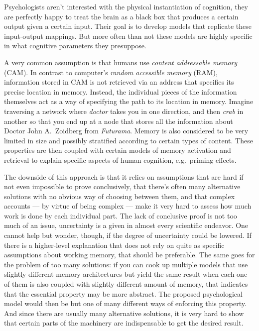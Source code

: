 Psychologists aren't interested with the physical instantiation of cognition, they are perfectly happy to treat the brain as a black box that produces a certain output given a certain input.
Their goal is to develop models that replicate these input-output mappings.
But more often than not these models are highly specific in what cognitive parameters they presuppose.

A very common assumption is that humans use \emph{content addressable memory} (CAM).
In contrast to computer's \emph{random accessible memory} (RAM), information stored in CAM is not retrieved via an address that specifies its precise location in memory.
Instead, the individual pieces of the information themselves act as a way of specifying the path to its location in memory.
Imagine traversing a network where \emph{doctor} takes you in one direction, and then \emph{crab} in another so that you end up at a node that stores all the information about Doctor John A.\ Zoidberg from \emph{Futurama}.
Memory is also considered to be very limited in size and possibly stratified according to certain types of content.
These properties are then coupled with certain models of memory activation and retrieval to explain specific aspects of human cognition, e.g.\ priming effects.

The downside of this approach is that it relies on assumptions that are hard if not even impossible to prove conclusively, that there's often many alternative solutions with no obvious way of choosing between them, and that complex accounts --- by virtue of being complex --- make it very hard to assess how much work is done by each individual part.
The lack of conclusive proof is not too much of an issue, uncertainty is a given in almost every scientific endeavor.
One cannot help but wonder, though, if the degree of uncertainty could be lowered.
If there is a higher-level explanation that does not rely on quite as specific assumptions about working memory, that should be preferable.
The same goes for the problem of too many solutions: if you can cook up multiple models that use slightly different memory architectures but yield the same result when each one of them is also coupled with slightly different amount of memory, that indicates that the essential property may be more abstract.
The proposed psychological model would then be but one of many different ways of enforcing this property.
And since there are usually many alternative solutions, it is very hard to show that certain parts of the machinery are indispensable to get the desired result.

